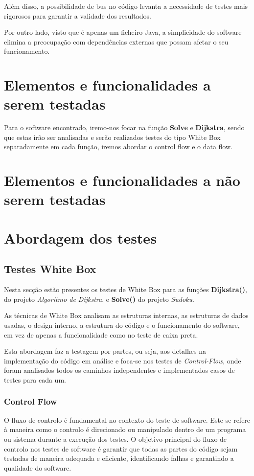 \documentclass{article}
\begin{document}
Além disso, a possibilidade de bus no código levanta a necessidade de testes mais rigorosos para garantir a validade dos resultados.

Por outro lado, visto que é apenas um ficheiro Java, a simplicidade do software elimina a preocupação com dependências externas que possam afetar o seu funcionamento.

\section{Elementos e funcionalidades a serem testadas}

Para o software encontrado, iremo-nos focar na função \textbf{Solve} e \textbf{Dijkstra}, sendo que estas irão ser analisadas e serão realizados testes do tipo White Box separadamente em cada função, iremos abordar o control flow e o data flow.



\section{Elementos e funcionalidades a não serem testadas}

\section{Abordagem dos testes}
\subsection{Testes White Box}
Nesta secção estão presentes os testes de White Box para as funções \textbf{Dijkstra()}, do projeto \textit{Algoritmo de Dijkstra}, e  \textbf{Solve()} do projeto \textit{Sudoku}.

As técnicas de White Box analisam as estruturas internas, as estruturas de dados usadas, o design interno, a estrutura do código e o funcionamento do software, em vez de apenas a funcionalidade como no teste de caixa preta.


Esta abordagem faz a testagem por partes, ou seja, aos detalhes na implementação do código em análise e foca-se nos testes de \textit{Control-Flow}, onde foram analisados todos os caminhos independentes e implementados casos de testes para cada um.

\subsubsection{Control Flow}
\quad O fluxo de controlo é fundamental no contexto do teste de software. Este se refere à maneira como o controlo é direcionado ou manipulado dentro de um programa ou sistema durante a execução dos testes. O objetivo principal do fluxo de controlo nos testes de software é garantir que todas as partes do código sejam testadas de maneira adequada e eficiente, identificando falhas e garantindo a qualidade do software.
\end{document}

